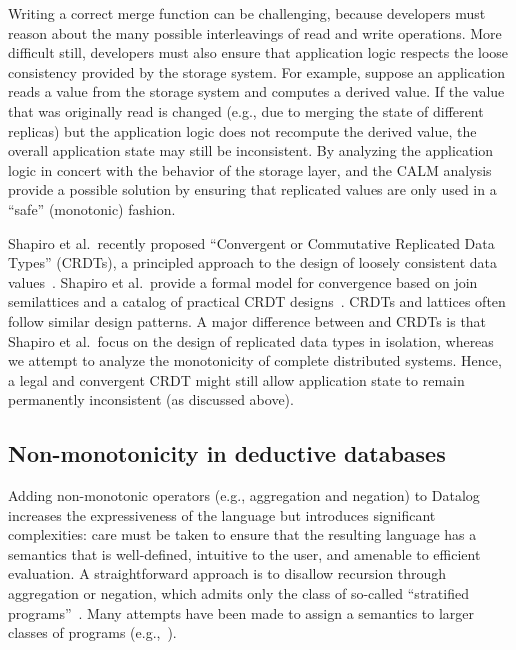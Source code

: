 Writing a correct merge function can be challenging, because developers must
reason about the many possible interleavings of read and write operations. More
difficult still, developers must also ensure that application logic respects the
loose consistency provided by the storage system. For example, suppose an
application reads a value from the storage system and computes a derived
value. If the value that was originally read is changed (e.g., due to merging
the state of different replicas) but the application logic does not recompute
the derived value, the overall application state may still be inconsistent. By
analyzing the application logic in concert with the behavior of the storage
layer, \lang and the CALM analysis provide a possible solution by ensuring that
replicated values are only used in a ``safe'' (monotonic) fashion.


Shapiro et al.\ recently proposed ``Convergent or Commutative Replicated Data
Types'' (CRDTs), a principled approach to the design of loosely consistent data
values~\cite{Shapiro2011b}. Shapiro et al.\ provide a formal model for
convergence based on join semilattices and a catalog of practical CRDT
designs~\cite{Shapiro2011a}. CRDTs and \lang lattices often follow similar
design patterns. A major difference between \lang and CRDTs is that Shapiro et
al.\ focus on the design of replicated data types in isolation, whereas we
attempt to analyze the monotonicity of complete distributed systems. Hence, a
legal and convergent CRDT might still allow application state to remain
permanently inconsistent (as discussed above).






\subsection{Non-monotonicity in deductive databases}
Adding non-monotonic operators (e.g., aggregation and negation) to Datalog
increases the expressiveness of the language but introduces significant
complexities: care must be taken to ensure that the resulting language has a
semantics that is well-defined, intuitive to the user, and amenable to efficient
evaluation. A straightforward approach is to disallow recursion through
aggregation or negation, which admits only the class of so-called ``stratified
programs''~\cite{Apt1988}. Many attempts have been made to assign a semantics to
larger classes of programs (e.g.,~\cite{Gelfond1988,Ross1990,VanGelder1991}).

